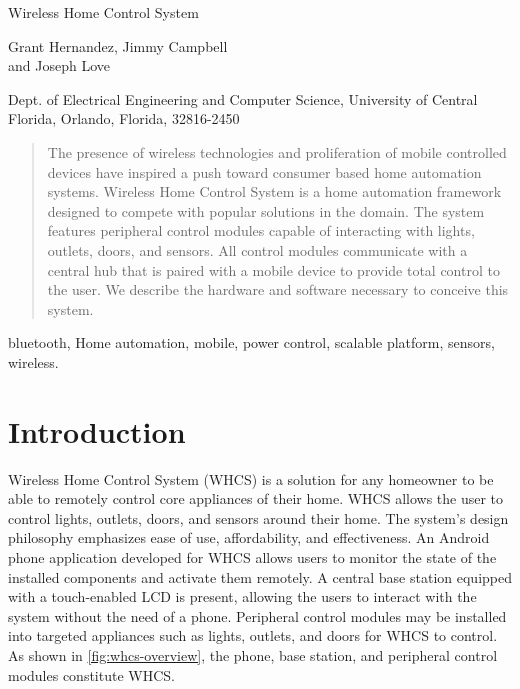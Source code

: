 \documentclass[draft,twocolumn,letterpaper,10pt]{IEEEtran}
\begin{document}

\setcounter{secnumdepth}{3}
\setcounter{tocdepth}{4}

\begin{center}
\huge Wireless Home Control System
\vspace{0.5cm}

\large Grant Hernandez, Jimmy Campbell\\ and Joseph Love
\vspace{0.5cm}

\large Dept. of Electrical Engineering and Computer Science, University of Central Florida, Orlando, Florida, 32816-2450  
\vspace{0.5cm}
\end{center}

\begin{abstract}
The presence of wireless technologies and proliferation of mobile controlled devices have inspired a push toward consumer based home automation systems. Wireless Home Control System is a home automation framework designed to compete with popular solutions in the domain. The system features peripheral control modules capable of interacting with lights, outlets, doors, and sensors. All control modules communicate with a central hub that is paired with a mobile device to provide total control to the user. We describe the hardware and software necessary to conceive this system.
\end{abstract}

\begin{IEEEkeywords}
bluetooth, Home automation, mobile, power control, scalable platform, sensors, wireless.
\end{IEEEkeywords}

\section{Introduction}
Wireless Home Control System (WHCS) is a solution for any homeowner to
be able to remotely control core appliances of their home. WHCS
allows the user to control lights, outlets, doors, and sensors around their
home. The system{}'s design philosophy emphasizes ease of use, affordability,
and effectiveness. An Android phone application developed for WHCS allows
users to monitor the state of the installed components and activate them
remotely. A central base station equipped with a touch{}-enabled LCD is
present, allowing the users to interact with the system without the need of a
phone. Peripheral control modules may be installed into targeted
appliances such as lights, outlets, and doors for WHCS to control. As shown in \autoref{fig:whcs-overview}, the
phone, base station, and peripheral control modules constitute WHCS.
\end{document}

